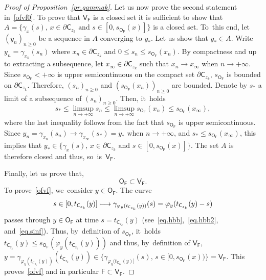 \documentclass[JEP,XML,SOM,Unicode,NoEqCountersInSection,NoFloatCountersInSection,published]{cedram}
\newcommand\mto{\mathchoice{\longmapsto}{\mapsto}{\mapsto}{\mapsto}}
\let\pa\partial
\theoremstyle{plain}
\theoremstyle{definition}
\begin{document}
\begin{proof}[Proof of Proposition~\ref{pr.gammak}]
Let us now prove the second statement in~\eqref{ofvf0}. To prove that $\mathsf V_{\mathsf F}$ is a closed set it is sufficient to show that $A= \big \{ \gamma_x(s), \, x\in \pa \mathsf C_{z_k} \text{ and } s\in [0,s_{\mathsf O_{\mathsf F}}(x)]\big \}$ is a closed set. To~this end, let $(y_n)_{n\ge 0}$ be a sequence in $A$ converging to $y_*$. Let us show that $y_*\in A$. Write $y_n=\gamma_{x_n}(s_n)$ where $x_n \in \pa { \mathsf C_{z_k}}$ and $0\le s_n\le s_{\mathsf O_{\mathsf F}}(x_n)$. By compactness and up to extracting a subsequence, let $x_{\infty}\in \pa { \mathsf C_{z_k}}$ such that $x_n\to x_{\infty}$ when $n\to +\infty$. Since $s_{\mathsf O_{\mathsf F}}<+\infty$ is upper semicontinuous on the compact set $\pa \mathsf C_{z_k}$, $s_{\mathsf O_{\mathsf F}}$ is bounded on $\pa \mathsf C_{z_k}$. Therefore, $(s_n)_{n\ge 0}$ and $(s_{\mathsf O_{\mathsf F}}(x_n))_{n\ge 0}$ are bounded. Denote by $s_{*}$ a limit of a subsequence of $(s_n)_{n\ge 0}$. Then, it~holds
\[
s_*\le \limsup_{n\to +\infty }s_n \le \limsup_{n\to +\infty }s_{\mathsf O_{\mathsf F}}(x_n) \le s_{\mathsf O_{\mathsf F}}(x_{\infty}),
\]
where the last inequality follows from the fact that $s_{\mathsf
O_{\mathsf F}}$ is upper semicontinuous. Since $y_n=
\gamma_{x_n}(s_n)\to \gamma_{x_{\infty}}(s_*)=y_*$ when $n\to
+\infty$, and $s_*\le s_{\mathsf O_{\mathsf F}}(x_{\infty})$, this
implies that $y_*\in \big \{ \gamma_x(s), \, x\in \pa \mathsf C_{z_k}
\text{ and } s\in [0,s_{\mathsf O_{\mathsf F}}(x)]\big \}$. The set
$A$ is therefore closed and thus, so~is~$\mathsf V_{\mathsf F}$.

Finally, let us prove that,
\begin{equation}\label{ofvf}
{\mathsf O_{\mathsf F}}\subset \mathsf V_{\mathsf F}.
\end{equation}
To prove~\eqref{ofvf}, we~consider $y\in \mathsf O_{\mathsf F}$.
The curve
\[
s\in [0,t_{\mathsf C_{z_k}}(y)] \mto \gamma_{\varphi_y(t_{\mathsf C_{z_k}}(y))}(s)= \varphi_y(t_{\mathsf C_{z_k}}(y)-s)
\]
passes through $y\in \mathsf O_{\mathsf F}$ at time $s=t_{\mathsf C_{z_k}}(y)$ (see~\eqref{eq.hbb},~\eqref{eq.hbb2}, and~\eqref{eq.sinf}). Thus, by~definition of $s_{\mathsf O_{\mathsf F}}$, it~holds $t_{\mathsf C_{z_k}}(y)\le s_{\mathsf O_{\mathsf F}}(\varphi_y(t_{\mathsf C_{z_k}}(y)))$ and thus, by~definition of $\mathsf V_{\mathsf F}$,
$y=\gamma_{\varphi_y(t_{\mathsf C_{z_k}}(y))}(t_{\mathsf C_{z_k}}(y))\in \{ \gamma_{\varphi_y(t_{\mathsf C_{z_k}}(y)]}(s),\, s \in [0,s_{\mathsf O_{\mathsf F}}(x))\}= \mathsf V_{\mathsf F}$.
This proves~\eqref{ofvf} and in particular $\mathsf F\subset\mathsf V_{\mathsf F}$.


\end{proof}
\end{document}
